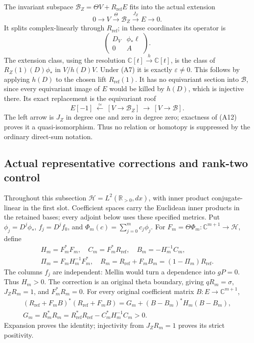 The invariant subspace
\(\mathscr B_Z=\Theta V+R_{\mathrm{ref}}E\) fits into the actual extension
\[
 0\to V\xrightarrow{\Theta}\mathscr B_Z\xrightarrow{J_Z}E\to0.
 \tag{A12}
\]
It splits complex-linearly through \(R_{\mathrm{ref}}\); in these coordinates its
operator is
\[
 \begin{pmatrix}D_V&\phi_*\ell\\0&A\end{pmatrix}.
\]
The extension class, using the resolution
\(\mathbb C[t]\xrightarrow{h}\mathbb C[t]\), is the class of
\(R_Z(1)(D)\phi_*\) in \(V/h(D)V\).
Under (A7) it is exactly \(\varepsilon\neq0\).
This follows by applying \(h(D)\) to the chosen lift \(R_{\mathrm{ref}}(1)\).
It has no equivariant section into \(\mathscr B\), since every
equivariant image of \(E\) would be killed by \(h(D)\), which is
injective there. Its exact replacement is the equivariant roof
\[
 E[-1]\ \xleftarrow{\simeq}\
   [V\to\mathscr B_Z]\ \longrightarrow\ [V\to\mathscr B].
 \tag{A13}
\]
The left arrow is \(J_Z\) in degree one and zero in degree zero;
exactness of (A12) proves it a quasi-isomorphism.
Thus no relation or homotopy is suppressed by the ordinary
direct-sum notation.

\subsection{Actual representative corrections and rank-two control}
Throughout this subsection \(\mathscr H=L^2(\mathbb R_{>0},dx)\),
with inner product conjugate-linear in the first slot. Coefficient
spaces carry the Euclidean inner products in the retained bases;
every adjoint below uses these specified metrics.
Put \(\phi_j=D^j\phi_*\), \(f_j=D^jf_0\), and
\(\Phi_m(c)=\sum_{j=0}^mc_j\phi_j\).
For \(F_m=\Theta\Phi_m:\mathbb C^{m+1}\to\mathscr H\), define
\[
 \begin{gathered}
 H_m=F_m^*F_m,\quad C_m=F_m^*R_{\mathrm{ref}},\quad
 B_m=-H_m^{-1}C_m,\\
 \Pi_m=F_mH_m^{-1}F_m^*,\quad
 R_m=R_{\mathrm{ref}}+F_mB_m=(1-\Pi_m)R_{\mathrm{ref}}.
 \end{gathered}
 \tag{A14}
\]
The columns \(f_j\) are independent: Mellin would turn a dependence
into \(gP=0\). Thus \(H_m>0\).
The correction is an original theta boundary, giving
\(qR_m=\sigma\), \(J_ZR_m=1\), and \(F_m^*R_m=0\).
For every original coefficient matrix \(B:E\to\mathbb C^{m+1}\),
\[
 \begin{gathered}
 (R_{\mathrm{ref}}+F_mB)^*(R_{\mathrm{ref}}+F_mB)
       =G_m+(B-B_m)^*H_m(B-B_m),\\
 G_m=R_m^*R_m=R_{\mathrm{ref}}^*R_{\mathrm{ref}}-C_m^*H_m^{-1}C_m>0 .
 \end{gathered}
 \tag{A15}
\]
Expansion proves the identity; injectivity from \(J_ZR_m=1\)
proves its strict positivity.

